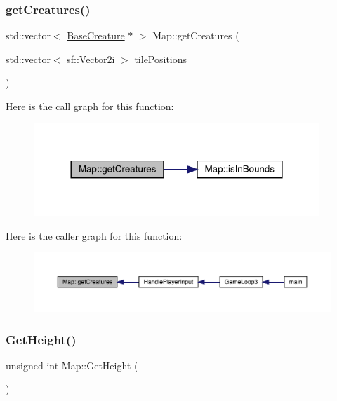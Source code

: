 \mbox{\label{class_map_a5b232a4d35b914192077be84d35f3354}} 
\subsubsection{\texorpdfstring{get\+Creatures()}{getCreatures()}}
{\footnotesize\ttfamily std\+::vector$<$ \mbox{\hyperlink{class_base_creature}{Base\+Creature}} $\ast$ $>$ Map\+::get\+Creatures (\begin{DoxyParamCaption}\item[{std\+::vector$<$ sf\+::\+Vector2i $>$}]{tile\+Positions }\end{DoxyParamCaption})}

Here is the call graph for this function\+:
\nopagebreak
\begin{figure}[H]
\begin{center}
\leavevmode
\includegraphics[width=305pt]{dd/d11/class_map_a5b232a4d35b914192077be84d35f3354_cgraph}
\end{center}
\end{figure}
Here is the caller graph for this function\+:
\nopagebreak
\begin{figure}[H]
\begin{center}
\leavevmode
\includegraphics[width=350pt]{dd/d11/class_map_a5b232a4d35b914192077be84d35f3354_icgraph}
\end{center}
\end{figure}
\mbox{\label{class_map_a5181eaa96c1d125523a2b16d0643bbd5}} 
\subsubsection{\texorpdfstring{Get\+Height()}{GetHeight()}}
{\footnotesize\ttfamily unsigned int Map\+::\+Get\+Height (\begin{DoxyParamCaption}{ }\end{DoxyParamCaption})}

